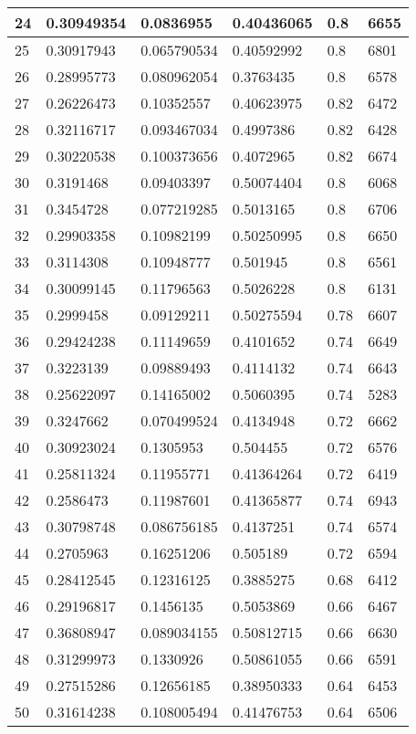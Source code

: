 \begin{longtable}{|l|l|l|l|l|l|}
24 & 0.30949354 & 0.0836955 & 0.40436065 & 0.8 & 6655 \\ \hline 
25 & 0.30917943 & 0.065790534 & 0.40592992 & 0.8 & 6801 \\ \hline 
26 & 0.28995773 & 0.080962054 & 0.3763435 & 0.8 & 6578 \\ \hline 
27 & 0.26226473 & 0.10352557 & 0.40623975 & 0.82 & 6472 \\ \hline 
28 & 0.32116717 & 0.093467034 & 0.4997386 & 0.82 & 6428 \\ \hline 
29 & 0.30220538 & 0.100373656 & 0.4072965 & 0.82 & 6674 \\ \hline 
30 & 0.3191468 & 0.09403397 & 0.50074404 & 0.8 & 6068 \\ \hline 
31 & 0.3454728 & 0.077219285 & 0.5013165 & 0.8 & 6706 \\ \hline 
32 & 0.29903358 & 0.10982199 & 0.50250995 & 0.8 & 6650 \\ \hline 
33 & 0.3114308 & 0.10948777 & 0.501945 & 0.8 & 6561 \\ \hline 
34 & 0.30099145 & 0.11796563 & 0.5026228 & 0.8 & 6131 \\ \hline 
35 & 0.2999458 & 0.09129211 & 0.50275594 & 0.78 & 6607 \\ \hline 
36 & 0.29424238 & 0.11149659 & 0.4101652 & 0.74 & 6649 \\ \hline 
37 & 0.3223139 & 0.09889493 & 0.4114132 & 0.74 & 6643 \\ \hline 
38 & 0.25622097 & 0.14165002 & 0.5060395 & 0.74 & 5283 \\ \hline 
39 & 0.3247662 & 0.070499524 & 0.4134948 & 0.72 & 6662 \\ \hline 
40 & 0.30923024 & 0.1305953 & 0.504455 & 0.72 & 6576 \\ \hline 
41 & 0.25811324 & 0.11955771 & 0.41364264 & 0.72 & 6419 \\ \hline 
42 & 0.2586473 & 0.11987601 & 0.41365877 & 0.74 & 6943 \\ \hline 
43 & 0.30798748 & 0.086756185 & 0.4137251 & 0.74 & 6574 \\ \hline 
44 & 0.2705963 & 0.16251206 & 0.505189 & 0.72 & 6594 \\ \hline 
45 & 0.28412545 & 0.12316125 & 0.3885275 & 0.68 & 6412 \\ \hline 
46 & 0.29196817 & 0.1456135 & 0.5053869 & 0.66 & 6467 \\ \hline 
47 & 0.36808947 & 0.089034155 & 0.50812715 & 0.66 & 6630 \\ \hline 
48 & 0.31299973 & 0.1330926 & 0.50861055 & 0.66 & 6591 \\ \hline 
49 & 0.27515286 & 0.12656185 & 0.38950333 & 0.64 & 6453 \\ \hline 
50 & 0.31614238 & 0.108005494 & 0.41476753 & 0.64 & 6506 \\ \hline 
\end{longtable}